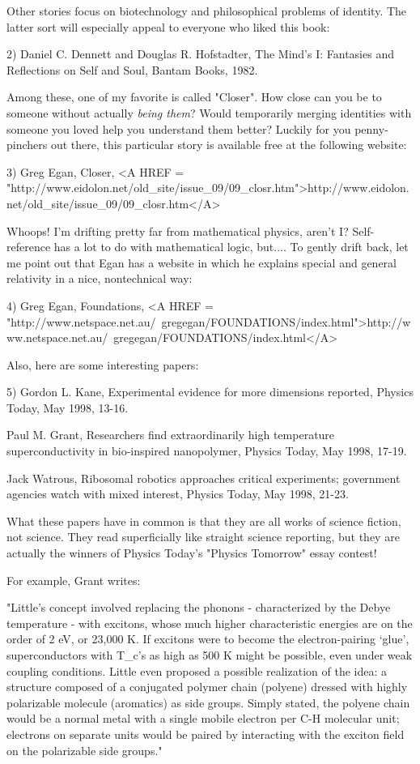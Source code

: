 Other stories focus on biotechnology and philosophical problems of
identity.   The latter sort will especially appeal to everyone who
liked this book:

2) Daniel C. Dennett and Douglas R. Hofstadter, The Mind's I: Fantasies
and Reflections on Self and Soul, Bantam Books, 1982.

Among these, one of my favorite is called "Closer".  How close can you
be to someone without actually \emph{being them}?  Would temporarily merging
identities with someone you loved help you understand them better?
Luckily for you penny-pinchers out there, this particular story is
available free at the following website:

3) Greg Egan, Closer, <A HREF = "http://www.eidolon.net/old_site/issue_09/09_closr.htm">http://www.eidolon.net/old_site/issue_09/09_closr.htm</A>

Whoops!  I'm drifting pretty far from mathematical physics, aren't I?
Self-reference has a lot to do with mathematical logic, but....  To
gently drift back, let me point out that Egan has a website in which he
explains special and general relativity in a nice, nontechnical way:

4) Greg Egan, Foundations, 
<A HREF = "http://www.netspace.net.au/~gregegan/FOUNDATIONS/index.html">http://www.netspace.net.au/~gregegan/FOUNDATIONS/index.html</A>

Also, here are some interesting papers:

5) Gordon L. Kane, Experimental evidence for more dimensions reported,
Physics Today, May 1998, 13-16.

Paul M. Grant, Researchers find extraordinarily high temperature
superconductivity in bio-inspired nanopolymer, Physics Today, May
1998, 17-19.

Jack Watrous, Ribosomal robotics approaches critical experiments;
government agencies watch with mixed interest, Physics Today, May
1998, 21-23.

What these papers have in common is that they are all works of science
fiction, not science.  They read superficially like straight science
reporting, but they are actually the winners of Physics Today's "Physics
Tomorrow" essay contest!

For example, Grant writes:

"Little's concept involved replacing the phonons - characterized by the
Debye temperature - with excitons, whose much higher characteristic
energies are on the order of 2 eV, or 23,000 K.  If excitons were to
become the electron-pairing `glue', superconductors with T_c's as high
as 500 K might be possible, even under weak coupling conditions.  Little
even proposed a possible realization of the idea: a structure composed
of a conjugated polymer chain (polyene) dressed with highly polarizable
molecule (aromatics) as side groups.  Simply stated, the polyene chain
would be a normal metal with a single mobile electron per C-H molecular
unit; electrons on separate units would be paired by interacting with
the exciton field on the polarizable side groups."


